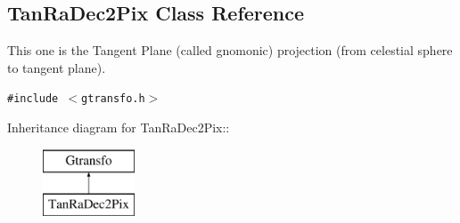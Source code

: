 \subsection{Tan\-Ra\-Dec2Pix  Class Reference}
\label{class_tanradec2pix}
This one is the Tangent Plane (called gnomonic) projection (from celestial sphere to tangent plane). 


{\tt \#include $<$gtransfo.h$>$}

Inheritance diagram for Tan\-Ra\-Dec2Pix::\begin{figure}[H]
\begin{center}
\leavevmode
\includegraphics[height=2cm]{class_tanradec2pix}
\end{center}
\end{figure}
